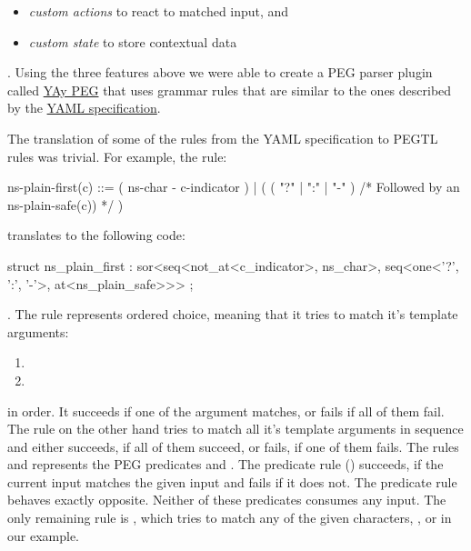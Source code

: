 \begin{itemize}
  \item \emph{custom actions} to react to matched input, and
  \item \emph{custom state} to store contextual data
\end{itemize}

. Using the three features above we were able to create a \gls{PEG} parser plugin called \href{https://libelektra.org/plugins/yaypeg}{YAy PEG} that uses grammar rules that are similar to the ones described by the \href{http://yaml.org/spec/1.2/spec}{YAML specification}.

The translation of some of the rules from the YAML specification to PEGTL rules was trivial. For example, the rule:

\begin{ccode}
ns-plain-first(c) ::= ( ns-char - c-indicator )
                    | ( ( "?" | ":" | "-" )
                        /* Followed by an ns-plain-safe(c)) */ )
\end{ccode}

translates to the following code:

\begin{cppcode}
struct ns_plain_first : sor<seq<not_at<c_indicator>, ns_char>,
                            seq<one<'?', ':', '-'>,
                                at<ns_plain_safe>>> {};
\end{cppcode}

. The rule  represents ordered choice, meaning that it tries to match it’s template arguments:

\begin{enumerate}
  \item {}
  \item {}
\end{enumerate}

in order. It succeeds if one of the argument matches, or fails if all of them fail. The rule  on the other hand tries to match all it’s template arguments in sequence and either succeeds, if all of them succeed, or fails, if one of them fails. The rules  and  represents the PEG predicates \cc{&} and \cc{!}. The predicate rule  (\cc{&}) succeeds, if the current input matches the given input and fails if it does not. The predicate rule  behaves exactly opposite. Neither of these predicates consumes any input. The only remaining rule is , which tries to match any of the given characters, ,  or  in our example.

